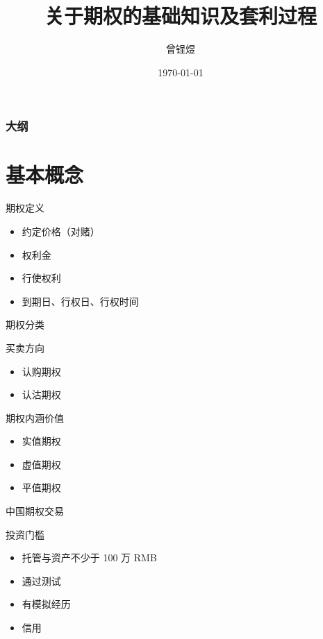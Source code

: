 \documentclass[12pt]{ctexbeamer}	%
\title[期权知识分享]{关于期权的基础知识及套利过程}	%
\author[Zengyu Zeng]{曾锃煜}
\institute[Hundsun]{资管，研发四部}	%
\date{\today}
\begin{document}
\begin{frame}
\titlepage
\end{frame}


\begin{frame}
\frametitle{大纲}
\tableofcontents
\end{frame}


\section{基本概念}

\begin{frame}{期权定义}
  \begin{itemize} %
    \item 约定价格（对赌）
    \item 权利金
    \item 行使权利
    \item 到期日、行权日、行权时间
  \end{itemize}
\end{frame}

\begin{frame}{期权分类}
  \begin{block}{买卖方向}
    \begin{itemize}
      \item 认购期权
      \item 认沽期权
    \end{itemize}
  \end{block}
  \begin{block}{期权内涵价值}
    \begin{itemize}
      \item 实值期权
      \item 虚值期权
      \item 平值期权
    \end{itemize}
  \end{block}
\end{frame}

\begin{frame}{中国期权交易}
  \begin{block}{投资门槛}
    \begin{itemize}
      \item 托管与资产不少于 100 万 RMB
      \item 通过测试
      \item 有模拟经历
      \item 信用
    \end{itemize}
  \end{block}
\end{frame}
\end{document}
